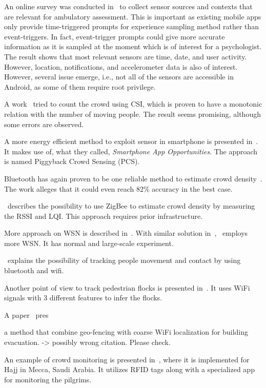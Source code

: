 \documentclass{article}
\begin{document}
An online survey was conducted in~\cite{thesis001} to collect sensor sources and contexts that are relevant for ambulatory assessment. This is important as existing mobile apps only provide time-triggered prompts for experience sampling method rather than event-triggers. In fact, event-trigger prompts could give more accurate information as it is sampled at the moment which is of interest for a psychologist. The result shows that most relevant sensors are time, date, and user activity. However, location, notifications, and accelerometer data is also of interest. However, several issue emerge, i.e., not all of the sensors are accessible in Android, as some of them require root privilege.

A work~\cite{thesis006} tried to count the crowd using CSI, which is proven to have a monotonic relation with the number of moving people. The result seems promising, although some errors are observed.

A more energy efficient method to exploit sensor in smartphone is presented in~\cite{thesis040}. It makes use of, what they called, \textit{Smartphone App Opportunities}. The approach is named Piggyback Crowd Sensing (PCS).

Bluetooth has again proven to be one reliable method to estimate crowd density~\cite{thesis041}. The work alleges that it could even reach 82\% accuracy in the best case.

\cite{thesis042}~describes the possibility to use ZigBee to estimate crowd density by measuring the RSSI and LQI. This approach requires prior infrastructure.

More approach on WSN is described in~\cite{thesis043}. With similar solution in~\cite{thesis042},~\cite{thesis043} employs more WSN. It has normal and large-scale experiment.

\cite{thesis022}~explains the possibility of tracking people movement and contact by using bluetooth and wifi.

Another point of view to track pedestrian flocks is presented in~\cite{thesis033}. It uses WiFi signals with 3 different features to infer the flocks.

A paper~\cite{thesis045} pres

\cite{thesis053} a method that combine geo-fencing with coarse WiFi localization for building evacuation. -> possibly wrong citation. Please check.

An example of crowd monitoring is presented in~\cite{thesis050}, where it is implemented for Hajj in Mecca, Saudi Arabia. It utilizes RFID tags along with a specialized app for monitoring the pilgrims.
\end{document}
